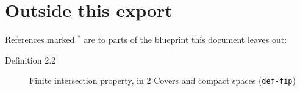 \documentclass[11pt]{article}
\newcommand{\bpslug}[1]{\texttt{#1}}
\begin{document}
\clearpage{}\hypertarget{bp-outside}{}%
\section*{Outside this export}
References marked \ensuremath{{}^\ast} are to parts of the blueprint this document leaves out:
\begin{description}
\item[Definition 2.2] Finite intersection property, in 2 Covers and compact spaces (\bpslug{def-{}\allowbreak{}fip})
\end{description}
\end{document}
